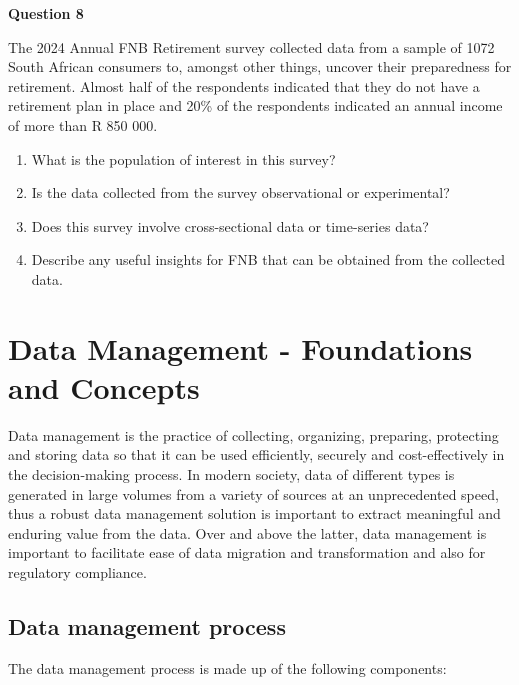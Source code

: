 \documentclass[
]{book}
\begin{document}
\textbf{Question 8}

The 2024 Annual FNB Retirement survey collected data from a sample of 1072 South African consumers to, amongst other things, uncover their preparedness for retirement. Almost half of the respondents indicated that they do not have a retirement plan in place and 20\% of the respondents indicated an annual income of more than R 850 000.

\begin{enumerate}
\def\labelenumi{\alph{enumi}.}
\item
  What is the population of interest in this survey?
\item
  Is the data collected from the survey observational or experimental?
\item
  Does this survey involve cross-sectional data or time-series data?
\item
  Describe any useful insights for FNB that can be obtained from the collected data.
\end{enumerate}

\section{Data Management - Foundations and Concepts}\label{sec1-3}

Data management is the practice of collecting, organizing, preparing, protecting and storing data so that it can be used efficiently, securely and cost-effectively in the decision-making process. In modern society, data of different types is generated in large volumes from a variety of sources at an unprecedented speed, thus a robust data management solution is important to extract meaningful and enduring value from the data. Over and above the latter, data management is important to facilitate ease of data migration and transformation and also for regulatory compliance.

\subsection{Data management process}\label{data-management-process}

The data management process is made up of the following components:
\end{document}
